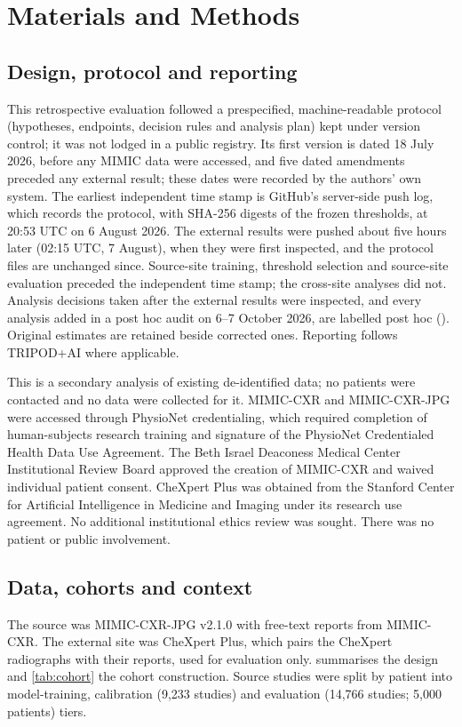 \section*{Materials and Methods}

\subsection*{Design, protocol and reporting}
This retrospective evaluation followed a prespecified, machine-readable
protocol (hypotheses, endpoints, decision rules and analysis plan) kept under
version control; it was not lodged in a public registry. Its first version is
dated 18 July 2026, before any MIMIC data were accessed, and five dated
amendments preceded any external result; these dates were recorded by the
authors' own system. The earliest independent time stamp is GitHub's
server-side push log, which records the protocol, with SHA-256 digests of the
frozen thresholds, at 20:53 UTC on 6 August 2026. The external results were
pushed about five hours later (02:15 UTC, 7 August), when they were first
inspected, and the protocol files are unchanged since. Source-site training,
threshold selection and source-site evaluation preceded the independent time
stamp; the cross-site analyses did not. Analysis decisions taken after the
external results were inspected, and every analysis added in a post hoc audit
on 6--7 October 2026, are labelled post hoc (). Original estimates are retained beside
corrected ones. Reporting follows TRIPOD+AI where applicable.\cite{collins2024}

This is a secondary analysis of existing de-identified data; no patients were
contacted and no data were collected for it. MIMIC-CXR and MIMIC-CXR-JPG were
accessed through PhysioNet credentialing, which required completion of
human-subjects research training and signature of the PhysioNet Credentialed
Health Data Use Agreement. The Beth Israel Deaconess Medical Center
Institutional Review Board approved the creation of MIMIC-CXR and waived
individual patient consent.\cite{johnson2019cxr} CheXpert Plus was obtained
from the Stanford Center for Artificial Intelligence in Medicine and Imaging
under its research use agreement. No additional institutional ethics review was
sought. There was no patient or public involvement.

\subsection*{Data, cohorts and context}
The source was MIMIC-CXR-JPG v2.1.0 with free-text reports from
MIMIC-CXR.\cite{johnson2019jpgpaper,johnson2024jpgdata,johnson2019cxr,johnson2024cxrdata,pollard2026}
The external site was CheXpert Plus,\cite{chambon2024} which pairs the CheXpert
radiographs\cite{irvin2019} with their reports, used for evaluation only.
 summarises the design and \cref{tab:cohort} the cohort
construction. Source studies were split by
patient into model-training, calibration (9,233 studies) and evaluation
(14,766 studies; 5,000 patients) tiers.

